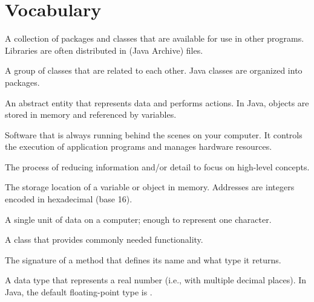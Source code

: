 \section{Vocabulary}

\begin{description}

A collection of packages and classes that are available for use in other programs.
Libraries are often distributed in  (Java Archive) files.

A group of classes that are related to each other.
Java classes are organized into packages.

An abstract entity that represents data and performs actions.
In Java, objects are stored in memory and referenced by variables.

Software that is always running behind the scenes on your computer.
It controls the execution of application programs and manages hardware resources.

The process of reducing information and/or detail to focus on high-level concepts.

The storage location of a variable or object in memory.
Addresses are integers encoded in hexadecimal (base 16).

A single unit of data on a computer; enough to represent one character.

A class that provides commonly needed functionality.


The signature of a method that defines its name and what type it returns.

A data type that represents a real number (i.e., with multiple decimal places).
In Java, the default floating-point type is .

\end{description}
